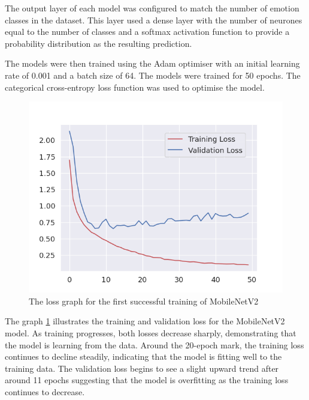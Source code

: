 The output layer of each model was configured to match the number of emotion classes in the dataset. This layer used a dense layer with the number of neurones equal to the number of classes and a softmax activation function to provide a probability distribution as the resulting prediction.

The models were then trained using the Adam optimiser with an initial learning rate of 0.001 and a batch size of 64. The models were trained for 50 epochs. The categorical cross-entropy loss function was used to optimise the model.

\begin{figure}[H]
    \centering{}
    \includegraphics[scale=0.5]{fed_images/train_loss_MobileNetv2.png}
    \caption{The loss graph for the first successful training of MobileNetV2}
    \label{figure:loss_mnv2}
\end{figure}

The graph \ref{figure:loss_mnv2} illustrates the training and validation loss for the MobileNetV2 model. As training progresses, both losses decrease sharply, demonstrating that the model is learning from the data. Around the 20-epoch mark, the training loss continues to decline steadily, indicating that the model is fitting well to the training data. The validation loss begins to see a slight upward trend after around 11 epochs suggesting that the model is overfitting as the training loss continues to decrease.

